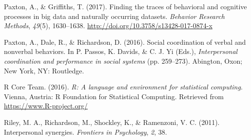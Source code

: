 \documentclass[10pt, letterpaper]{article}
\begin{document}
\hypertarget{ref-paxton2017finding}{}
Paxton, A., \& Griffiths, T. (2017). Finding the traces of behavioral
and cognitive processes in big data and naturally occurring datasets.
\emph{Behavior Research Methods}, \emph{49}(5), 1630--1638.
\url{http://doi.org/10.3758/s13428-017-0874-x}

\hypertarget{ref-paxton2016social}{}
Paxton, A., Dale, R., \& Richardson, D. (2016). Social coordination of
verbal and nonverbal behaviors. In P. Passos, K. Davids, \& C. J. Yi
(Eds.), \emph{Interpersonal coordination and performance in social
systems} (pp. 259--273). Abington, Oxon; New York, NY: Routledge.

\hypertarget{ref-r2016r}{}
R Core Team. (2016). \emph{R: A language and environment for statistical
computing}. Vienna, Austria: R Foundation for Statistical Computing.
Retrieved from \url{https://www.R-project.org/}

\hypertarget{ref-riley2011interpersonal}{}
Riley, M. A., Richardson, M., Shockley, K., \& Ramenzoni, V. C. (2011).
Interpersonal synergies. \emph{Frontiers in Psychology}, \emph{2}, 38.
\end{document}
